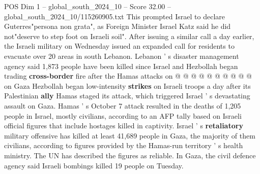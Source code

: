 \begin{textsample}{POS Dim 1 – global\_south\_2024\_10 – Score 32.00 – global\_south\_2024\_10/115260905.txt}
This prompted Israel to declare Guterres"persona non grata", as Foreign Minister Israel Katz said he did not"deserve to step foot on Israeli soil".
After issuing a similar call a day earlier, the Israeli military on Wednesday issued an expanded call for residents to evacuate over 20 areas in south Lebanon.
Lebanon ' s disaster management agency said 1,873 people have been killed since Israel and Hezbollah began trading \textbf{cross-border} fire after the Hamas attacks on @ @ @ @ @ @ @ @ @ @ on Gaza Hezbollah began low-intensity \textbf{strikes} on Israeli troops a day after its Palestinian \textbf{ally} Hamas staged its attack, which triggered Israel ' s devastating assault on Gaza.
Hamas ' s October 7 attack resulted in the deaths of 1,205 people in Israel, mostly civilians, according to an AFP tally based on Israeli official figures that include hostages killed in captivity.
Israel ' s \textbf{retaliatory} military offensive has killed at least 41,689 people in Gaza, the majority of them civilians, according to figures provided by the Hamas-run territory ' s health ministry.
The UN has described the figures as reliable.
In Gaza, the civil defence agency said Israeli bombings killed 19 people on Tuesday.

\end{textsample}
